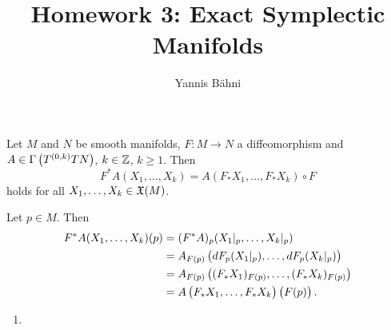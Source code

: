 

\title{Homework 3: Exact Symplectic Manifolds}
\author{Yannis B\"ahni}
\address[Yannis B\"ahni]{University of Zurich, R\"amistrasse 71, 8006 Zurich}



\maketitle
\thispagestyle{fancy}
\setcounter{section}{1}

\begin{exercise}
Let $M$ and $N$ be smooth manifolds, $F : M \to N$ a diffeomorphism and $A \in \Gamma\del[1]{T^{(0,k)}TN}$, $k \in \mathbb{Z}$, $k \geq 1$. Then 
\begin{equation}
F^*A(X_1,\dots,X_k) = A(F_*X_1,\dots,F_*X_k) \circ F
\end{equation}
\noindent holds for all $X_1,\dots,X_k \in \mathfrak{X}(M)$.
\label{ex_properties_pullback}
\end{exercise}

\begin{solution}
Let $p \in M$. Then
\begin{align*}
F^*A(X_1,\dots,X_k)(p) &= (F^*A)_p(X_1\vert_p,\dots,X_k\vert_p)\\
&= A_{F(p)}\del[1]{d F_p(X_1\vert_p),\dots,d F_p(X_k\vert_p)}\\
&= A_{F(p)}\del[1]{(F_*X_1)_{F(p)},\dots,(F_*X_k)_{F(p)}}\\
&= A\del[1]{F_*X_1,\dots,F_*X_k}\del[1]{F(p)}.
\end{align*}
\end{solution}

\begin{exercise} 
\begin{enumerate}[label = \textup{(}\alph*\textup{)}]
\item  
\end{enumerate}
\end{exercise}

